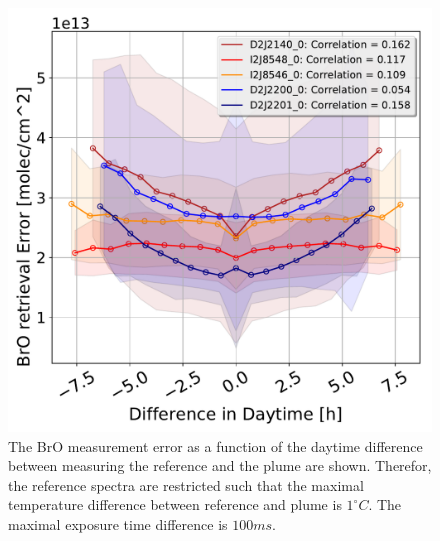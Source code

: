 \documentclass  [
  paper    = a4,
  BCOR     = 10mm,
  twoside,
  fontsize = 12pt,
  fleqn,
  toc      = bibnumbered,
  toc      = listofnumbered,
  numbers  = noendperiod,
  headings = normal,
  listof   = leveldown,
  version  = 3.03
]                                       {scrreprt}
\begin{document}
\begin{figure}
	\centering
	\includegraphics[width=0.7\linewidth]{Bilder/BrOErr_OhnEVar/DiffDaytimewithoutOtherparamallInstruments}
	\caption{The BrO measurement error as a function of the daytime difference between measuring the reference and the plume are shown. Therefor, the reference spectra are restricted such that the maximal temperature difference between reference and plume is $1^\circ C$. The maximal exposure time difference is $100 ms$.
	}
	\label{fig:diffdaytimewithoutotherparamallinstruments}
\end{figure}
\end{document}
